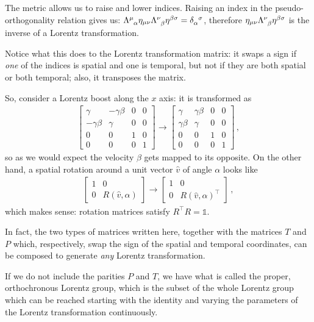\documentclass[main.tex]{subfiles}
\begin{document}
The metric allows us to raise and lower indices. Raising an index in the pseudo-orthogonality relation gives us: \(\tensor{\Lambda}{^\mu_\alpha} \eta_{\mu\nu} \tensor{\Lambda}{^\nu_\beta} \eta^{\beta\sigma} =\tensor{\delta}{_\alpha ^\sigma}\), therefore  \(\eta_{\mu\nu} \tensor{\Lambda}{^\nu_\beta} \eta^{\beta\sigma}\) is the inverse of a Lorentz transformation.

\begin{bluebox}

Notice what this does to the Lorentz transformation matrix: it swaps a sign if \emph{one} of the indices is spatial and one is temporal, but not if they are both spatial or both temporal; also, it transposes the matrix. 

So, consider a Lorentz boost along the \(x\) axis: it is transformed as 
%
\begin{align}
\left[\begin{array}{cccc}
  \gamma  & - \gamma \beta  & 0 & 0 \\ 
  -\gamma \beta  & \gamma  & 0 & 0 \\ 
  0 & 0 & 1 & 0 \\ 
  0 & 0 & 0 & 1
\end{array}\right] \rightarrow
\left[\begin{array}{cccc}
  \gamma  & \gamma \beta  & 0 & 0 \\ 
  \gamma \beta  & \gamma  & 0 & 0 \\ 
  0 & 0 & 1 & 0 \\ 
  0 & 0 & 0 & 1
\end{array}\right]
\,,
\end{align}
%
so as we would expect the velocity \(\beta \) gets mapped to its opposite. On the other hand, a spatial rotation around a unit vector \(\hat{v}\) of angle \(\alpha \) looks like 
%
\begin{align}
\left[\begin{array}{cc}
1 & 0 \\ 
0 & R(\hat{v}, \alpha )
\end{array}\right] \rightarrow
\left[\begin{array}{cc}
1 & 0 \\ 
0 & R(\hat{v}, \alpha )^{\top}
\end{array}\right]
\,,
\end{align}
which makes sense: rotation matrices satisfy \(R^{\top}R = \mathbb{1}\).

In fact, the two types of matrices written here, together with the matrices \(T\) and \(P\) which, respectively, swap the sign of the spatial and temporal coordinates, can be composed to generate \emph{any} Lorentz transformation.

If we do not include the parities \(P\) and \(T\), we have what is called the proper, orthochronous Lorentz group, which is the subset of the whole Lorentz group which can be reached starting with the identity and varying the parameters of the Lorentz transformation continuously. 
\end{bluebox}
\end{document}
